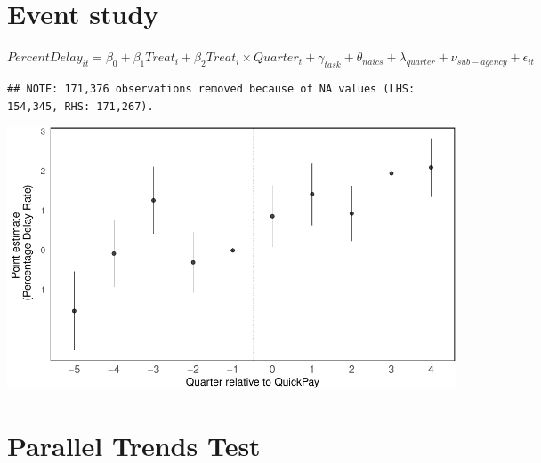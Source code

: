 \documentclass[
]{article}
\begin{document}
\hypertarget{event-study}{%
\section{Event study}\label{event-study}}

\(PercentDelay_{it}=\beta_0 + \beta_1 Treat_i + \beta_2 Treat_i \times Quarter_t + \gamma_{task} + \theta_{naics}+\lambda_{quarter}+\nu_{sub-agency}+\epsilon_{it}\)

\begin{verbatim}
## NOTE: 171,376 observations removed because of NA values (LHS: 154,345, RHS: 171,267).
\end{verbatim}

\includegraphics{qp_first_pc_delay_one_type_files/figure-latex/event_study-1.pdf}

\hypertarget{parallel-trends-test}{%
\section{Parallel Trends Test}\label{parallel-trends-test}}
\end{document}
